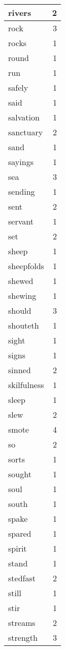 \begin{center}
\begin{longtable}{l|r}
rivers & 2\\ \hline 
rock & 3\\ \hline 
rocks & 1\\ \hline 
round & 1\\ \hline 
run & 1\\ \hline 
safely & 1\\ \hline 
said & 1\\ \hline 
salvation & 1\\ \hline 
sanctuary & 2\\ \hline 
sand & 1\\ \hline 
sayings & 1\\ \hline 
sea & 3\\ \hline 
sending & 1\\ \hline 
sent & 2\\ \hline 
servant & 1\\ \hline 
set & 2\\ \hline 
sheep & 1\\ \hline 
sheepfolds & 1\\ \hline 
shewed & 1\\ \hline 
shewing & 1\\ \hline 
should & 3\\ \hline 
shouteth & 1\\ \hline 
sight & 1\\ \hline 
signs & 1\\ \hline 
sinned & 2\\ \hline 
skilfulness & 1\\ \hline 
sleep & 1\\ \hline 
slew & 2\\ \hline 
smote & 4\\ \hline 
so & 2\\ \hline 
sorts & 1\\ \hline 
sought & 1\\ \hline 
soul & 1\\ \hline 
south & 1\\ \hline 
spake & 1\\ \hline 
spared & 1\\ \hline 
spirit & 1\\ \hline 
stand & 1\\ \hline 
stedfast & 2\\ \hline 
still & 1\\ \hline 
stir & 1\\ \hline 
streams & 2\\ \hline 
strength & 3\\ \hline 

\end{longtable}
\end{center}
